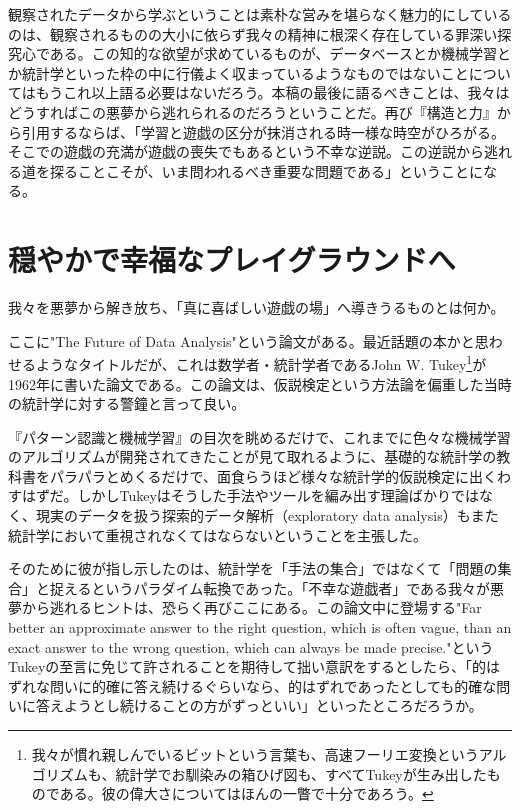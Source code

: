 観察されたデータから学ぶということは素朴な営みを堪らなく魅力的にしているのは、観察されるものの大小に依らず我々の精神に根深く存在している罪深い探究心である。この知的な欲望が求めているものが、データベースとか機械学習とか統計学といった枠の中に行儀よく収まっているようなものではないことについてはもうこれ以上語る必要はないだろう。本稿の最後に語るべきことは、我々はどうすればこの悪夢から逃れられるのだろうということだ。再び『構造と力』から引用するならば、「学習と遊戯の区分が抹消される時一様な時空がひろがる。そこでの遊戯の充満が遊戯の喪失でもあるという不幸な逆説。この逆説から逃れる道を探ることこそが、いま問われるべき重要な問題である」ということになる。

\section{穏やかで幸福なプレイグラウンドへ}
我々を悪夢から解き放ち、「真に喜ばしい遊戯の場」へ導きうるものとは何か。

ここに"The Future of Data Analysis"という論文がある。最近話題の本かと思わせるようなタイトルだが、これは数学者・統計学者であるJohn W. Tukey\footnote{我々が慣れ親しんでいるビットという言葉も、高速フーリエ変換というアルゴリズムも、統計学でお馴染みの箱ひげ図も、すべてTukeyが生み出したものである。彼の偉大さについてはほんの一瞥で十分であろう。}が1962年に書いた論文である。この論文は、仮説検定という方法論を偏重した当時の統計学に対する警鐘と言って良い。

『パターン認識と機械学習』の目次を眺めるだけで、これまでに色々な機械学習のアルゴリズムが開発されてきたことが見て取れるように、基礎的な統計学の教科書をパラパラとめくるだけで、面食らうほど様々な統計学的仮説検定に出くわすはずだ。しかしTukeyはそうした手法やツールを編み出す理論ばかりではなく、現実のデータを扱う探索的データ解析（exploratory data analysis）もまた統計学において重視されなくてはならないということを主張した。

そのために彼が指し示したのは、統計学を「手法の集合」ではなくて「問題の集合」と捉えるというパラダイム転換であった。「不幸な遊戯者」である我々が悪夢から逃れるヒントは、恐らく再びここにある。この論文中に登場する"Far better an approximate answer to the right question, which is often vague, than an exact answer to the wrong question, which can always be made precise."というTukeyの至言に免じて許されることを期待して拙い意訳をするとしたら、「的はずれな問いに的確に答え続けるぐらいなら、的はずれであったとしても的確な問いに答えようとし続けることの方がずっといい」といったところだろうか。

